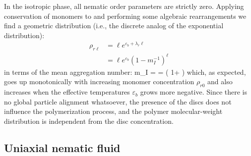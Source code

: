 In the isotropic phase, all nematic order parameters are strictly zero. Applying conservation of monomers to  and performing some algebraic rearrangements we find a geometric distribution (i.e., the discrete analog of the exponential distribution):
\begin{align}
\rho_{r \ell } & =   \ell e^{ \varepsilon_{b} + \lambda_{r} \ell }  \nonumber \\
&= \ell e^{ \varepsilon_{b}} \left ( 1 - m_{I}^{-1} \right ) ^{\ell} \label{disi}
\end{align}
in terms of the mean aggregation number:
\beq
m_{I} =   =  \left ( 1+ \right ) 
\label{miso}
\eeq
which, as expected, goes up monotonically with increasing monomer concentration  $\rho_{r0} $ and also increases when the effective temperatures  $\varepsilon_{b}$ grows more negative.  Since there is no global particle alignment whatsoever, the presence of the discs does not influence the polymerization process, and the polymer molecular-weight distribution is independent from the disc concentration.  

\subsection{Uniaxial nematic fluid}

